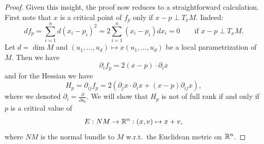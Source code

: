 \begin{proof}
    Given this insight, the proof now reduces to a straightforward calculation.
    First note that $x$ is a critical point of $f_p$ only if $x-p \perp T_x M$.
    Indeed:
    \[
        d f_p = \sum_{i=1}^{n} d(x_i - p_i)^2 = 2 \sum_{i=1}^{n} (x_i-p_i) dx_i = 0 \qquad \text{if $x-p \perp T_x M$}
    .\] 
    Let $d = \dim M$ and $(u_1, \ldots, u_d) \mapsto x(u_1, \ldots, u_d)$ be a local parametrization of $M$.
    Then we have
    \[
        \partial_i f_p = 2(x-p) \cdot  \partial_i  x
    \] 
    and for the Hessian we have
    \[
    H_p = \partial_{ij} f_p = 2 \left(\partial_j x \cdot \partial_i x  + (x-p) \partial_{ij} x \right)
    ,\] 
    where we denoted $\partial_i = \frac{\partial }{\partial u_i}$.
    We will show that $H_p$ is not of full rank if and only if $p$ is a critical value of  
    \[
        E: NM \to  \mathbb{R}^n: (x, v) \mapsto x + v
    ,\] 
    where $NM$ is the normal bundle to $M$ w.r.t.\ the Euclidean metric on $\mathbb{R}^n$.


\end{proof}
